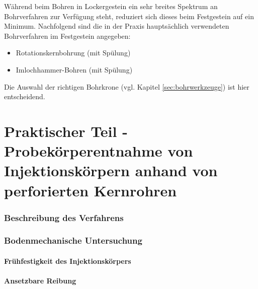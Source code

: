 \documentclass[12pt,a4paper,draft]{scrartcl} %
\begin{document}
Während beim Bohren in Lockergestein ein sehr breites Spektrum an Bohrverfahren zur Verfügung steht, reduziert sich dieses beim Festgestein auf ein Minimum. Nachfolgend sind die in der Praxis hauptsächlich verwendeten Bohrverfahren im Festgestein angegeben:

\begin{itemize}
\item Rotationskernbohrung (mit Spülung)
\item Imlochhammer-Bohren (mit Spülung)
\end{itemize}

Die Auswahl der richtigen Bohrkrone (vgl. Kapitel \ref{sec:bohrwerkzeuge}) ist hier entscheidend.

\newpage
\part{Praktischer Teil - Probekörperentnahme von Injektionskörpern anhand von perforierten Kernrohren}

\setcounter{section}{0}

\section{Beschreibung des Verfahrens}

\section{Bodenmechanische Untersuchung}

\subsection{Frühfestigkeit des Injektionskörpers}

\subsection{Ansetzbare Reibung}

\vspace{\fill}
\nocite{*}                              %
\printbibliography


\ifdraft{%
	\newpage	%
	\todos%
}
\end{document}
